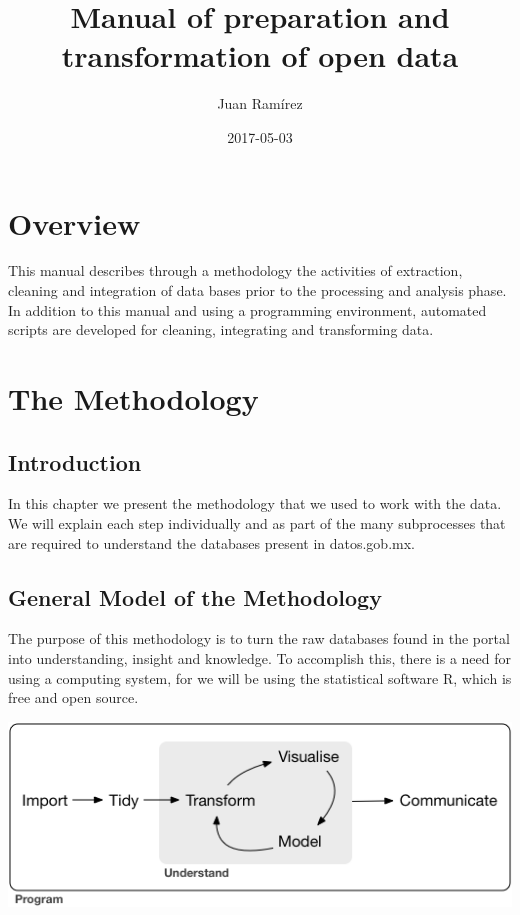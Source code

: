 \documentclass[]{book}
\title{Manual of preparation and transformation of open data}
\author{Juan Ramírez}
\date{2017-05-03}
\begin{document}
\maketitle

{
\setcounter{tocdepth}{1}
\tableofcontents
}
\chapter{Overview}\label{overview}

This manual describes through a methodology the activities of
extraction, cleaning and integration of data bases prior to the
processing and analysis phase. In addition to this manual and using a
programming environment, automated scripts are developed for cleaning,
integrating and transforming data.

\chapter{The Methodology}\label{methodology}

\section{Introduction}\label{introduction}

In this chapter we present the methodology that we used to work with the
data. We will explain each step individually and as part of the many
subprocesses that are required to understand the databases present in
datos.gob.mx.

\section{General Model of the
Methodology}\label{general-model-of-the-methodology}

The purpose of this methodology is to turn the raw databases found in
the portal into understanding, insight and knowledge. To accomplish
this, there is a need for using a computing system, for we will be using
the statistical software R, which is free and open source.

\includegraphics[width=7.18in]{diagrams/data-science}
\end{document}
